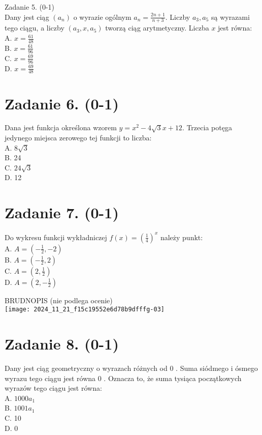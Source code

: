 \documentclass[10pt]{article}
\begin{document}
Zadanie 5. (0-1)\\
Dany jest ciąg \(\left(a_{n}\right)\) o wyrazie ogólnym \(a_{n}=\frac{2 n+1}{n+3}\). Liczby \(a_{3}, a_{5}\) są wyrazami tego ciągu, a liczby \(\left(a_{3}, x, a_{5}\right)\) tworzą ciąg arytmetyczny. Liczba \(x\) jest równa:\\
A. \(x=\frac{61}{48}\)\\
B. \(x=\frac{61}{96}\)\\
C. \(x=\frac{69}{96}\)\\
D. \(x=\frac{69}{48}\)

\section*{Zadanie 6. (0-1)}
Dana jest funkcja określona wzorem \(y=x^{2}-4 \sqrt{3} x+12\). Trzecia potęga jedynego miejsca zerowego tej funkcji to liczba:\\
A. \(8 \sqrt{3}\)\\
B. 24\\
C. \(24 \sqrt{3}\)\\
D. 12

\section*{Zadanie 7. (0-1)}
Do wykresu funkcji wykładniczej \(f(x)=\left(\frac{1}{4}\right)^{x}\) należy punkt:\\
A. \(A=\left(-\frac{1}{2},-2\right)\)\\
B. \(A=\left(-\frac{1}{2}, 2\right)\)\\
C. \(A=\left(2, \frac{1}{2}\right)\)\\
D. \(A=\left(2,-\frac{1}{2}\right)\)

BRUDNOPIS (nie podlega ocenie)\\
\texttt{[image: 2024\_11\_21\_f15c19552e6d78b9dfffg-03]}

\section*{Zadanie 8. (0-1)}
Dany jest ciąg geometryczny o wyrazach różnych od 0 . Suma siódmego i ósmego wyrazu tego ciągu jest równa 0 . Oznacza to, że suma tysiąca początkowych wyrazów tego ciągu jest równa:\\
A. \(1000 a_{1}\)\\
B. \(1001 a_{1}\)\\
C. 10\\
D. 0
\end{document}
